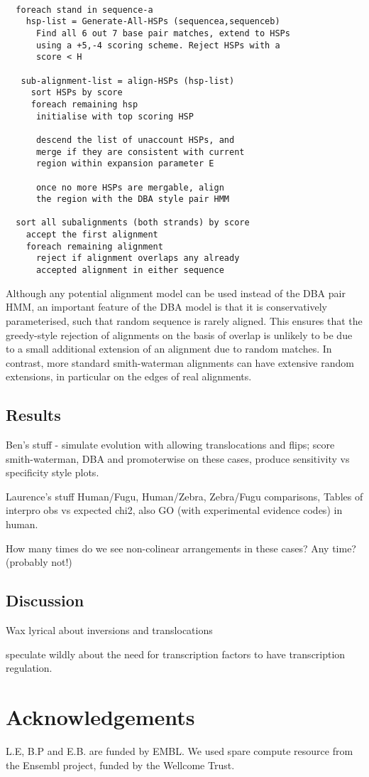 \documentclass{article} \usepackage{a4}
\begin{document}
\begin{verbatim}

  foreach stand in sequence-a
    hsp-list = Generate-All-HSPs (sequencea,sequenceb)
      Find all 6 out 7 base pair matches, extend to HSPs
      using a +5,-4 scoring scheme. Reject HSPs with a
      score < H

   sub-alignment-list = align-HSPs (hsp-list) 
     sort HSPs by score
     foreach remaining hsp
      initialise with top scoring HSP

      descend the list of unaccount HSPs, and
      merge if they are consistent with current
      region within expansion parameter E 

      once no more HSPs are mergable, align
      the region with the DBA style pair HMM

  sort all subalignments (both strands) by score
    accept the first alignment
    foreach remaining alignment
      reject if alignment overlaps any already
      accepted alignment in either sequence

\end{verbatim}

Although any potential alignment model can be used instead
of the DBA pair HMM, an important feature of the DBA model is
that it is conservatively parameterised, such that random sequence
is rarely aligned. This ensures that the greedy-style rejection
of alignments on the basis of overlap is unlikely to be due to a small
additional extension of an alignment due to random matches. In contrast,
more standard smith-waterman alignments can have extensive random
extensions, in particular on the edges of real alignments.

\subsection{Results}

Ben's stuff - simulate evolution with allowing translocations and
flips; score smith-waterman, DBA and promoterwise on these cases,
produce sensitivity vs specificity style plots.
 

Laurence's stuff Human/Fugu, Human/Zebra, Zebra/Fugu comparisons, Tables of 
interpro obs vs expected chi2, also GO (with experimental evidence codes) in 
human.

How many times do we see non-colinear arrangements in these cases? Any
time? (probably not!)


\subsection{Discussion}
     
     
Wax lyrical about inversions and translocations

speculate wildly about the need for transcription factors to have
transcription regulation.


\section{Acknowledgements}

L.E, B.P and E.B. are funded by EMBL. We used spare compute resource
from the Ensembl project, funded by the Wellcome Trust.



\end{document}
